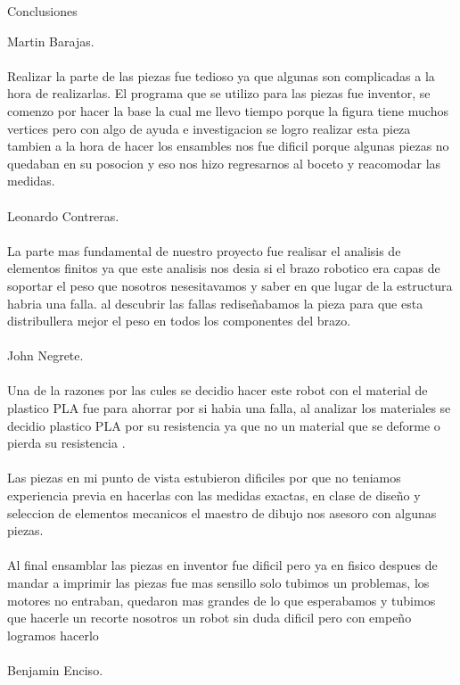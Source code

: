 \documentclass[12pt,letterpaper]{article}
\begin{document}
\newpage
\begin{flushleft}
Conclusiones
\end{flushleft}
Martin Barajas.
\\\\
Realizar la parte de las piezas fue tedioso ya que algunas son complicadas a la hora de realizarlas. El programa que se utilizo para las piezas fue inventor, se comenzo por hacer la base la cual me llevo tiempo porque la figura tiene muchos vertices pero con algo de ayuda  e investigacion se logro realizar esta pieza tambien a la hora de hacer los ensambles nos fue dificil porque algunas piezas no quedaban en su posocion y eso nos hizo regresarnos al boceto y reacomodar las medidas. 
\\\\
Leonardo Contreras. 
\\\\
La parte mas fundamental de nuestro proyecto fue realisar el analisis de elementos finitos ya que este analisis nos desia si el brazo robotico era capas de soportar el peso que nosotros nesesitavamos y saber en que lugar de la estructura habria una falla. al descubrir las fallas rediseñabamos la pieza para que esta distribullera mejor el peso en todos los componentes del brazo.
\\\\
John Negrete.
\\\\
Una de la razones por las cules se decidio hacer este robot con el material de plastico PLA fue para ahorrar por si habia una falla, al analizar los materiales se decidio plastico PLA por su resistencia ya que no un material que se deforme o pierda su resistencia .
\\\\
Las piezas en mi punto de vista  estubieron  dificiles por que no teniamos experiencia previa en hacerlas con las medidas exactas, en clase de diseño y seleccion de elementos mecanicos el maestro de dibujo nos asesoro con algunas piezas.
\\\\
Al final ensamblar las piezas en inventor fue dificil pero ya en fisico despues de mandar a imprimir las piezas fue mas sensillo solo tubimos un problemas, los motores no entraban, quedaron mas grandes de lo que esperabamos y tubimos que hacerle un recorte nosotros un robot sin duda dificil pero con empeño logramos hacerlo 
\\\\
Benjamin Enciso.
\\\\
\end{document}
